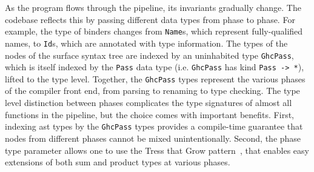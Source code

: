 \documentclass[thesis=B,english]{FITthesis}[2019/12/23]
\newcommand{\hsType}[1]{\texttt{#1}}
\begin{document}
As the program flows through the pipeline, its invariants gradually change. The
codebase reflects this by passing different data types from phase to phase. For
example, the type of binders changes from \hsType{Name}s, which represent
fully-qualified names, to \hsType{Id}s, which are annotated with type
information. The types of the nodes of the surface syntax tree are indexed by
an uninhabited type \hsType{GhcPass}, which is itself indexed by the
\hsType{Pass} data type (i.e. \hsType{GhcPass} has kind \hsType{Pass -> *}),
lifted to the type level.  Together, the \hsType{GhcPass} types represent the
various phases of the compiler front end, from parsing to renaming to type
checking. The type level distinction between phases complicates the type
signatures of almost all functions in the pipeline, but the choice comes with
important benefits.  First, indexing \acrshort{ast} types by the
\hsType{GhcPass} types provides a compile-time guarantee that nodes from
different phases cannot be mixed unintentionally. Second, the phase type
parameter allows one to use the Tress that Grow pattern~\cite{trees-that-grow},
that enables easy extensions of both sum and product types at various phases.
\end{document}
